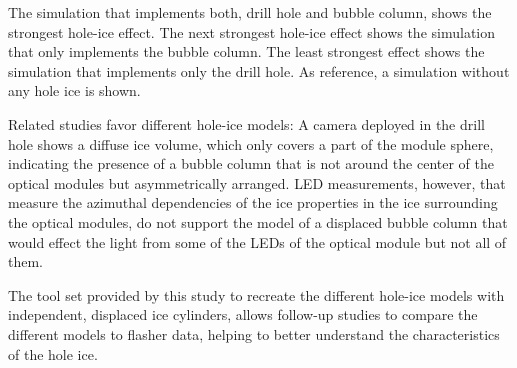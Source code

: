 The simulation that implements both, drill hole and bubble column, shows the strongest hole-ice effect. The next strongest hole-ice effect shows the simulation that only implements the bubble column. The least strongest effect shows the simulation that implements only the drill hole. As reference, a simulation without any hole ice is shown.

Related studies favor different hole-ice models: A camera deployed in the drill hole shows a diffuse ice volume, which only covers a part of the module sphere, indicating the presence of a bubble column that is not around the center of the optical modules but asymmetrically arranged. \cite{instrumentation,rongenswedishcamera} LED measurements, however, that measure the azimuthal dependencies of the ice properties in the ice surrounding the optical modules, do not support the model of a displaced bubble column that would effect the light from some of the LEDs of the optical module but not all of them. \cite{rongenswedishcamera}

The tool set provided by this study to recreate the different hole-ice models with independent, displaced ice cylinders, allows follow-up studies to compare the different models to flasher data, helping to better understand the characteristics of the hole ice.\followup